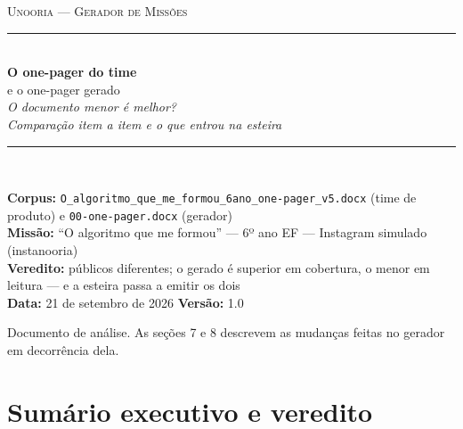 \documentclass[11pt,a4paper]{article}
\newcommand{\arq}[1]{\texttt{\small #1}}
\begin{document}
\begin{titlepage}
\centering
\vspace*{2.5cm}

{\color{SteelBlue}\large\scshape Unooria --- Gerador de Missões}\\[0.4cm]
{\color{BorderGray}\rule{0.8\textwidth}{1.2pt}}\\[1.0cm]

{\Huge\bfseries\color{NavyBlue} O one-pager do time}\\[0.4cm]
{\LARGE\color{NavyBlue} e o one-pager gerado}\\[1.2cm]

{\large\itshape O documento menor é melhor?}\\[0.3cm]
{\large\itshape Comparação item a item e o que entrou na esteira}\\[1.5cm]

{\color{BorderGray}\rule{0.8\textwidth}{0.6pt}}\\[1.0cm]

\begin{minipage}{0.8\textwidth}
\centering
\small
\textbf{Corpus:} \arq{O\_algoritmo\_que\_me\_formou\_6ano\_one-pager\_v5.docx} (time de produto) e \arq{00-one-pager.docx} (gerador)\\
\textbf{Missão:} ``O algoritmo que me formou'' --- 6º ano EF --- Instagram simulado (instanooria)\\
\textbf{Veredito:} públicos diferentes; o gerado é superior em cobertura, o menor em leitura --- e a esteira passa a emitir os dois\\[0.6cm]
\textbf{Data:} 21 de setembro de 2026 \quad\textbullet\quad \textbf{Versão:} 1.0
\end{minipage}

\vfill
{\small\color{Charcoal} Documento de análise. As seções 7 e 8 descrevem as mudanças feitas no gerador em decorrência dela.}
\end{titlepage}

\tableofcontents
\newpage

\section{Sumário executivo e veredito}
\end{document}
